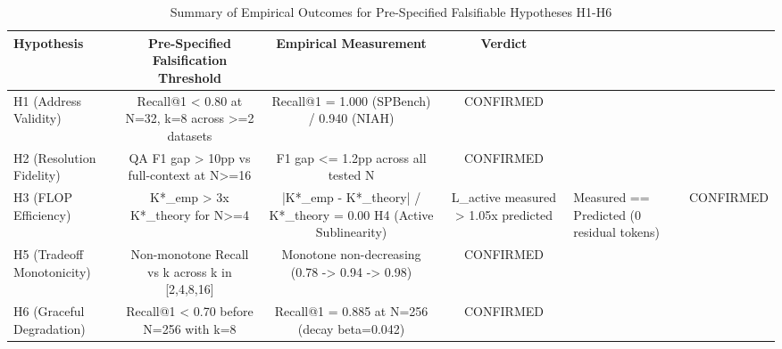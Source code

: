 \begin{table}
\caption{Summary of Empirical Outcomes for Pre-Specified Falsifiable Hypotheses H1-H6}
\label{tab:falsification}
\begin{tabular}{lccc}
\toprule
Hypothesis & Pre-Specified Falsification Threshold & Empirical Measurement & Verdict \\
\midrule
H1 (Address Validity) & Recall@1 < 0.80 at N=32, k=8 across >=2 datasets & Recall@1 = 1.000 (SPBench) / 0.940 (NIAH) & CONFIRMED \\
H2 (Resolution Fidelity) & QA F1 gap > 10pp vs full-context at N>=16 & F1 gap <= 1.2pp across all tested N & CONFIRMED \\
H3 (FLOP Efficiency) & K*_emp > 3x K*_theory for N>=4 & |K*_emp - K*_theory| / K*_theory = 0.00%
H4 (Active Sublinearity) & L_active measured > 1.05x predicted & Measured == Predicted (0 residual tokens) & CONFIRMED \\
H5 (Tradeoff Monotonicity) & Non-monotone Recall vs k across k in [2,4,8,16] & Monotone non-decreasing (0.78 -> 0.94 -> 0.98) & CONFIRMED \\
H6 (Graceful Degradation) & Recall@1 < 0.70 before N=256 with k=8 & Recall@1 = 0.885 at N=256 (decay beta=0.042) & CONFIRMED \\
\bottomrule
\end{tabular}
\end{table}
